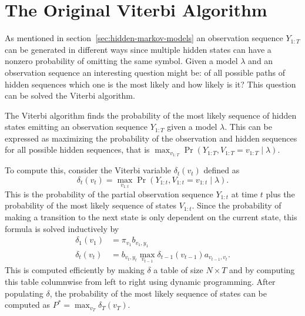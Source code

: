 \section{The Original Viterbi Algorithm}
\label{sec:class-viterbi-algor}

As mentioned in section~\ref{sec:hidden-markov-models} an observation sequence
$Y_{1:T}$ can be generated in different ways since multiple hidden states can
have a nonzero probability of omitting the same symbol. Given a model $\lambda$
and an observation sequence an interesting question might be: of all possible
paths of hidden sequences which one is the most likely and how likely is it?
This question can be solved the Viterbi algorithm.

The Viterbi algorithm finds the probability of the most likely sequence of
hidden states emitting an observation sequence $Y_{1:T}$ given a model
$\lambda$. This can be expressed as maximizing the probability of the
observation and hidden sequences for all possible hidden sequences, that is
$\max_{v_{1:T}} \Pr(Y_{1:T}, V_{1:T} = v_{1:T} \mid \lambda)$.

To compute this, consider the Viterbi variable $\delta_t(v_t)$ defined as
\begin{equation*}
  \delta_t(v_t) = \max_{v_{1:t}} \Pr(Y_{1:t}, V_{1:t} = v_{1:t} \mid \lambda).
\end{equation*}
This is the probability of the partial observation sequence $Y_{1:t}$ at time
$t$ plus the probability of the most likely sequence of states $V_{1:t}$. Since
the probability of making a transition to the next state is only dependent on
the current state, this formula is solved inductively by
\begin{equation}
  \label{eq:1}
  \begin{aligned}
    \delta_1(v_1) &= \pi_{v_1} b_{v_1, y_1} \\
    \delta_t(v_t) &= b_{v_t, y_t} \max_{v_{t - 1}} \delta_{t - 1}(v_{t - 1}) a_{v_{t - 1}, v_t}.
  \end{aligned}
\end{equation}
This is computed efficiently by making $\delta$ a table of size
$N \times T$ and by computing this table columnwise from left to right
using dynamic programming. After populating $\delta$,
the probability of the most likely sequence of states can be computed as
$P^* = \max_{v_T} \delta_T(v_T)$.

